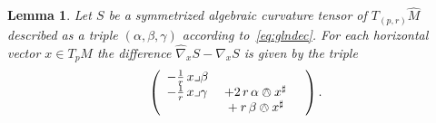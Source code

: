 \documentclass[11pt,a4paper]{article}
\theoremstyle{plain}
\newtheorem{lemma}{Lemma}
\theoremstyle{remark}
\begin{document}
\bigskip
\begin{lemma}\label{le:parallel_in_the_horizontal_direction}
Let $S$ be a symmetrized algebraic curvature tensor of $T_{(p,r)}\hat M$ described as a triple $(\alpha,\beta,\gamma)$ according to~\eqref{eq:glndec}.
For each horizontal  vector $x\in T_pM$ the difference $\hat \nabla_xS - \nabla_xS$
is given by the triple
\begin{equation}\label{eq:second_fundamental_form_of_bbP}
\left (  \begin{array}{lll}
 - \frac{1}{r}\, x\lrcorner \beta & & \\
 - \frac{1}{r}\, x\lrcorner \gamma  & \; + 2\, r\, \alpha \owedge x^\sharp &\\
&\mbox{\ } + r\, \beta\owedge x^\sharp &
\end{array} \right ).
 \end{equation} 
\end{lemma}
\end{document}
